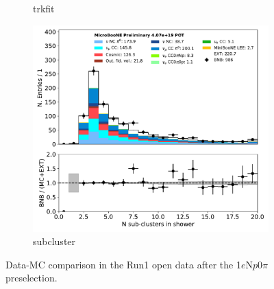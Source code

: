 \documentclass[a4paper]{article}
\newcommand{\npsel}{1$e$N$p$0$\pi$ }
\begin{document}
\begin{figure}[H]
\begin{center}
\begin{subfigure}[b]{0.3\textwidth}
    \caption{\label{fig:1eNp:dataMCRun1:trkfit} trkfit }
    \end{subfigure}
    \begin{subfigure}[b]{0.3\textwidth}
    \centering
    \includegraphics[width=1.00\textwidth]{1eNp/dataMCRun1/subcluster01152020.pdf}
    \caption{\label{fig:1eNp:dataMCRun1:subcluster} subcluster }
    \end{subfigure}
\caption{\label{fig:1eNp:dataMCRun1:numu1}Data-MC comparison in the Run1 open data after the \npsel preselection.}
\end{center}
\end{figure}
\end{document}
